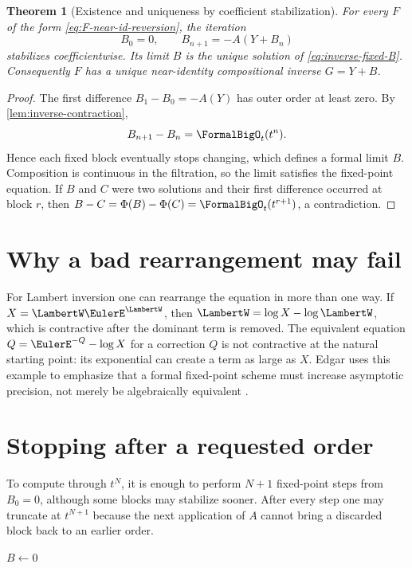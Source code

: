 \documentclass[11pt,oneside]{book}
\newtheorem{theorem}{Theorem}[chapter]
\theoremstyle{definition}
\theoremstyle{remark}
\newcommand{\compinv}{^{\langle-1\rangle_{\circ}}}
\newcommand{\compose}{\mathbin{\circ}}
\newcommand{\trunc}[2]{\left[#1\right]_{\le #2}}
\begin{document}
\begin{theorem}[Existence and uniqueness by coefficient stabilization]
\label{thm:fixed-inverse}
For every $F$ of the form \eqref{eq:F-near-id-reversion}, the iteration
\begin{equation}\label{eq:fixed-inverse-iteration}
 B_0=0,
 \qquad
 B_{n+1}=-A(Y+B_n)
\end{equation}
stabilizes coefficientwise.  Its limit $B$ is the unique solution of
\eqref{eq:inverse-fixed-B}.  Consequently $F$ has a unique near-identity
compositional inverse $G=Y+B$.
\end{theorem}
\begin{proof}
The first difference $B_1-B_0=-A(Y)$ has outer order at least zero.
By \cref{lem:inverse-contraction},
\[
 B_{n+1}-B_n=\FormalBigO_t(t^n).
\]
Hence each fixed block eventually stops changing, which defines a formal
limit $B$.  Composition is continuous in the filtration, so the limit
satisfies the fixed-point equation.  If $B$ and $C$ were two solutions and
their first difference occurred at block $r$, then
$B-C=\Phi(B)-\Phi(C)=\FormalBigO_t(t^{r+1})$, a contradiction.
\end{proof}

\section{Why a bad rearrangement may fail}
For Lambert inversion one can rearrange the equation in more than one way.
If $X=\LambertW\EulerE^\LambertW$, then $\LambertW=\log X-\log \LambertW$, which is contractive after the dominant
term is removed.  The equivalent equation $Q=\EulerE^{-Q}-\log X$ for a correction
$Q$ is not contractive at the natural starting point: its exponential can
create a term as large as $X$.  Edgar uses this example to emphasize that a
formal fixed-point scheme must increase asymptotic precision, not merely be
algebraically equivalent \cite{EdgarBeginners}.

\section{Stopping after a requested order}
To compute through $t^N$, it is enough to perform $N+1$ fixed-point steps from
$B_0=0$, although some blocks may stabilize sooner.  After every step one may
truncate at $t^{N+1}$ because the next application of $A$ cannot bring a
discarded block back to an earlier order.

\begin{algorithm}[H]
\caption{Fixed-point compositional inversion}
\label{alg:fixed-inverse}
\KwOut{$G=\trunc{F\compinv}{N}$}
$B\leftarrow0$\;
\For{$j\leftarrow0$ \KwTo $N$}{
  $B\leftarrow\trunc{-\,A\compose(Y+B)}{N}$\;
}
\;
\end{algorithm}
\end{document}
